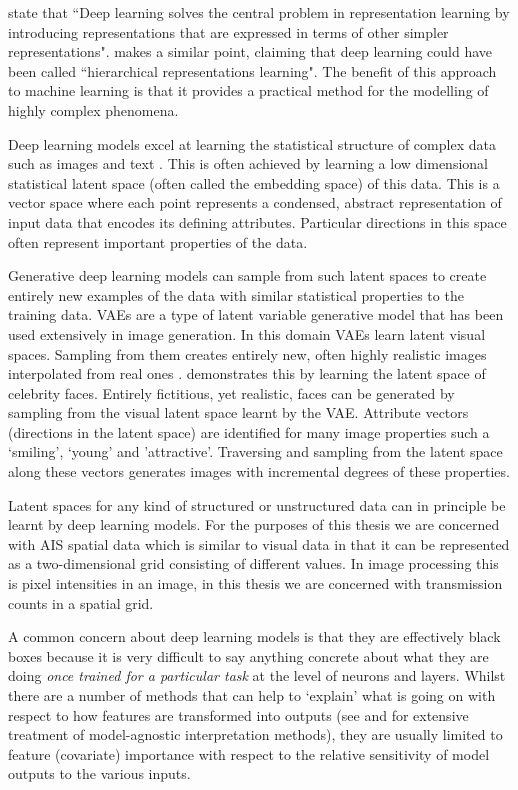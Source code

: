 \documentclass{mldsmsc}
\begin{document}
\cite{GoodBengCour16} state that “Deep learning solves the central problem in representation learning by introducing representations that are expressed in terms of other simpler representations". \cite{chollet2021deep} makes a similar point, claiming that deep learning could have been called “hierarchical representations learning". The benefit of this approach to machine learning is that it provides a practical method for the modelling of highly complex phenomena.

 Deep learning models excel at learning the statistical structure of complex data such as images and text \citep{chollet2021deep}. This is often achieved by learning a low dimensional statistical latent space (often called the embedding space) of this data. This is a vector space where each point represents a condensed, abstract representation of input data that encodes its defining attributes. Particular directions in this space often represent important properties of the data.

Generative deep learning models can sample from such latent spaces to create entirely new examples of the data with similar statistical properties to the training data. VAEs are a type of latent variable generative model that has been used extensively in image generation. In this domain VAEs learn latent visual spaces. Sampling from them creates entirely new, often highly realistic images interpolated from real ones \citep{chollet2021deep}.  \cite{white2016sampling} demonstrates this by learning the latent space of celebrity faces. Entirely fictitious, yet realistic, faces can be generated by sampling from the visual latent space learnt by the VAE. Attribute vectors (directions in the latent space) are identified for many image properties such a ‘smiling’, ‘young’ and 'attractive'. Traversing and sampling from the latent space along these vectors generates images with incremental degrees of these properties.

Latent spaces for any kind of structured or unstructured data can in principle be learnt by deep learning models. For the purposes of this thesis we are concerned with AIS spatial data which is similar to visual data in that it can be represented as a two-dimensional grid consisting of different values. In image processing this is pixel intensities in an image, in this thesis we are concerned with transmission counts in a spatial grid.

A common concern about deep learning models is that they are effectively black boxes because it is very difficult to say anything concrete about what they are doing \textit{once trained for a particular task} at the level of neurons and layers. Whilst there are a number of methods that can help to `explain' what is going on with respect to how features are transformed into outputs (see \cite{ribeiro2016should} and \cite{NIPS2017_7062} for extensive treatment of model-agnostic interpretation methods), they are usually limited to feature (covariate) importance with respect to the relative sensitivity of model outputs to the various inputs. 
\end{document}
